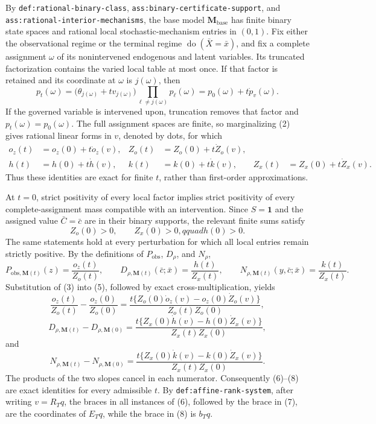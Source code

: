 By \texttt{def:rational-binary-class}, \texttt{ass:binary-certificate-support}, and \texttt{ass:rational-interior-mechanisms}, the base model \(\mathbf M_{\mathrm{base}}\) has finite binary state spaces and rational local stochastic-mechanism entries in \((0,1)\).  Fix either the observational regime or the terminal regime \(\operatorname{do}(\bar X=\bar x)\), and fix a complete assignment \(\omega\) of its nonintervened endogenous and latent variables.  Its truncated factorization contains the varied local table at most once.  If that factor is retained and its coordinate at \(\omega\) is \(j(\omega)\), then
\[
 p_t(\omega)
 =\bigl(\theta_{j(\omega)}+t v_{j(\omega)}\bigr)
   \prod_{\ell\ne j(\omega)}p_\ell(\omega)
 =p_0(\omega)+t\dot p_v(\omega).                              \tag{2}
\]
If the governed variable is intervened upon, truncation removes that factor and \(p_t(\omega)=p_0(\omega)\).  The full assignment spaces are finite, so marginalizing (2) gives rational linear forms in \(v\), denoted by dots, for which
\[
\begin{aligned}
 o_z(t)&=o_z(0)+t\dot o_z(v),&
 Z_o(t)&=Z_o(0)+t\dot Z_o(v),\\
 h(t)&=h(0)+t\dot h(v),&
 k(t)&=k(0)+t\dot k(v),&
 Z_x(t)&=Z_x(0)+t\dot Z_x(v).
\end{aligned}                                                   \tag{3}
\]
Thus these identities are exact for finite \(t\), rather than first-order approximations.

At \(t=0\), strict positivity of every local factor implies strict positivity of every complete-assignment mass compatible with an intervention.  Since \(S=\mathbf 1\) and the assigned value \(\bar C=\bar c\) are in their binary supports, the relevant finite sums satisfy
\[
 Z_o(0)>0,\qquad Z_x(0)>0,qquad h(0)>0.                       \tag{4}
\]
The same statements hold at every perturbation for which all local entries remain strictly positive.  By the definitions of \(P_{\mathrm{obs}}\), \(D_\rho\), and \(N_\rho\),
\[
 P_{\mathrm{obs},\mathbf M(t)}(z)=\frac{o_z(t)}{Z_o(t)},\qquad
 D_{\rho,\mathbf M(t)}(\bar c;\bar x)=\frac{h(t)}{Z_x(t)},
 \qquad
 N_{\rho,\mathbf M(t)}(y,\bar c;\bar x)=\frac{k(t)}{Z_x(t)}. \tag{5}
\]
Substitution of (3) into (5), followed by exact cross-multiplication, yields
\[
 \frac{o_z(t)}{Z_o(t)}-\frac{o_z(0)}{Z_o(0)}
 =\frac{t\{Z_o(0)\dot o_z(v)-o_z(0)\dot Z_o(v)\}}
        {Z_o(t)Z_o(0)},                                        \tag{6}
\]
\[
 D_{\rho,\mathbf M(t)}-D_{\rho,\mathbf M(0)}
 =\frac{t\{Z_x(0)\dot h(v)-h(0)\dot Z_x(v)\}}
        {Z_x(t)Z_x(0)},                                        \tag{7}
\]
and
\[
 N_{\rho,\mathbf M(t)}-N_{\rho,\mathbf M(0)}
 =\frac{t\{Z_x(0)\dot k(v)-k(0)\dot Z_x(v)\}}
        {Z_x(t)Z_x(0)}.                                        \tag{8}
\]
The products of the two slopes cancel in each numerator.  Consequently (6)--(8) are exact identities for every admissible \(t\).  By \texttt{def:affine-rank-system}, after writing \(v=R_Tq\), the braces in all instances of (6), followed by the brace in (7), are the coordinates of \(E_Tq\), while the brace in (8) is \(b_Tq\).

